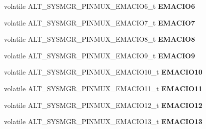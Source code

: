 \begin{DoxyCompactItemize}
\item 
\mbox{\label{structALT__SYSMGR__PINMUX__s_a3cff376f7b2f59735e758f8ae72e0cb8}} 
volatile A\+L\+T\+\_\+\+S\+Y\+S\+M\+G\+R\+\_\+\+P\+I\+N\+M\+U\+X\+\_\+\+E\+M\+A\+C\+I\+O6\+\_\+t {\bfseries E\+M\+A\+C\+I\+O6}
\item 
\mbox{\label{structALT__SYSMGR__PINMUX__s_a4a34c6b83f1b8ef38f23921e07c039d1}} 
volatile A\+L\+T\+\_\+\+S\+Y\+S\+M\+G\+R\+\_\+\+P\+I\+N\+M\+U\+X\+\_\+\+E\+M\+A\+C\+I\+O7\+\_\+t {\bfseries E\+M\+A\+C\+I\+O7}
\item 
\mbox{\label{structALT__SYSMGR__PINMUX__s_a9fc4f67570e5e944aca64cf1d43798bd}} 
volatile A\+L\+T\+\_\+\+S\+Y\+S\+M\+G\+R\+\_\+\+P\+I\+N\+M\+U\+X\+\_\+\+E\+M\+A\+C\+I\+O8\+\_\+t {\bfseries E\+M\+A\+C\+I\+O8}
\item 
\mbox{\label{structALT__SYSMGR__PINMUX__s_abc5e86ed0c05d939b9f6a3aa45f0b887}} 
volatile A\+L\+T\+\_\+\+S\+Y\+S\+M\+G\+R\+\_\+\+P\+I\+N\+M\+U\+X\+\_\+\+E\+M\+A\+C\+I\+O9\+\_\+t {\bfseries E\+M\+A\+C\+I\+O9}
\item 
\mbox{\label{structALT__SYSMGR__PINMUX__s_a16892479f5cdf8d48355514d3a3080fa}} 
volatile A\+L\+T\+\_\+\+S\+Y\+S\+M\+G\+R\+\_\+\+P\+I\+N\+M\+U\+X\+\_\+\+E\+M\+A\+C\+I\+O10\+\_\+t {\bfseries E\+M\+A\+C\+I\+O10}
\item 
\mbox{\label{structALT__SYSMGR__PINMUX__s_af5a0827401dd7e4b61d2d4ca754657ce}} 
volatile A\+L\+T\+\_\+\+S\+Y\+S\+M\+G\+R\+\_\+\+P\+I\+N\+M\+U\+X\+\_\+\+E\+M\+A\+C\+I\+O11\+\_\+t {\bfseries E\+M\+A\+C\+I\+O11}
\item 
\mbox{\label{structALT__SYSMGR__PINMUX__s_a10f7f676925b37f2289d6a11cbad092e}} 
volatile A\+L\+T\+\_\+\+S\+Y\+S\+M\+G\+R\+\_\+\+P\+I\+N\+M\+U\+X\+\_\+\+E\+M\+A\+C\+I\+O12\+\_\+t {\bfseries E\+M\+A\+C\+I\+O12}
\item 
\mbox{\label{structALT__SYSMGR__PINMUX__s_abbcc001f4dc0b760acbb2909cfa74985}} 
volatile A\+L\+T\+\_\+\+S\+Y\+S\+M\+G\+R\+\_\+\+P\+I\+N\+M\+U\+X\+\_\+\+E\+M\+A\+C\+I\+O13\+\_\+t {\bfseries E\+M\+A\+C\+I\+O13}

\end{DoxyCompactItemize}
